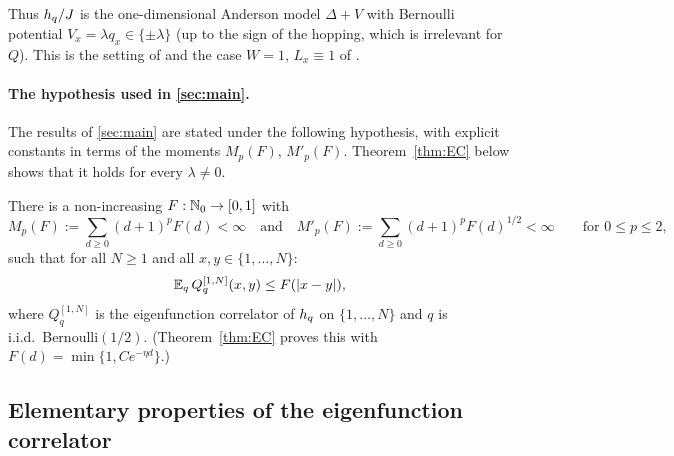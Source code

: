 Thus $h_{q}/J$ is the one-dimensional Anderson model $\Delta+V$ with Bernoulli potential $V_x=\lambda q_x\in\{\pm\lambda\}$
(up to the sign of the hopping, which is irrelevant for $Q$).  This is the setting of
\cite{Bucaj2019,JZ2019,GeZhao2020,Macera2023} and the case $W=1$, $L_x\equiv1$ of \cite{MaceraSodin2022}.

\paragraph{The hypothesis used in \cref{sec:main}.}
The results of \cref{sec:main} are stated under the following hypothesis, with explicit constants
in terms of the moments $M_p(F)$, $M'_p(F)$.  Theorem~\ref{thm:EC} below shows that it holds for
every $\lambda\ne0$.

\begin{hypothesis}[EC]\label{hyp:EC}
There is a non-increasing $F:\mathbb{N}_0\to[0,1]$ with
\[
  M_p(F):=\sum_{d\ge0}(d+1)^pF(d)<\infty\quad\text{and}\quad M'_p(F):=\sum_{d\ge0}(d+1)^pF(d)^{1/2}<\infty
  \qquad\text{for }0\le p\le2,
\]
such that for all $N\ge1$ and all $x,y\in\{1,\dots,N\}$:
\begin{equation}\label{eq:hypEC}
  \mathbb{E}_q\,Q^{[1,N]}_q(x,y)\le F(|x-y|),
\end{equation}
where $Q^{[1,N]}_q$ is the eigenfunction correlator of $h_{q}$ on $\{1,\dots,N\}$ and $q$ is i.i.d.\
Bernoulli$(1/2)$.  (Theorem~\ref{thm:EC} proves this with $F(d)=\min\{1,Ce^{-\eta d}\}$.)
\end{hypothesis}

\subsection{Elementary properties of the eigenfunction correlator}\label{sec:onebody:elem}

